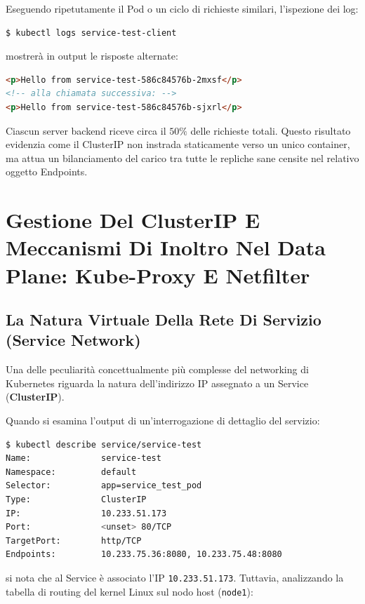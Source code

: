 \documentclass[11pt, a4paper]{article}
\begin{document}
Eseguendo ripetutamente il Pod o un ciclo di richieste similari, l'ispezione dei log:
\begin{lstlisting}[language=bash]
$ kubectl logs service-test-client
\end{lstlisting}
mostrerà in output le risposte alternate:
\begin{lstlisting}[language=html]
<p>Hello from service-test-586c84576b-2mxsf</p>
<!-- alla chiamata successiva: -->
<p>Hello from service-test-586c84576b-sjxrl</p>
\end{lstlisting}

Ciascun server backend riceve circa il $50\%$ delle richieste totali. Questo risultato evidenzia come il ClusterIP non instrada staticamente verso un unico container, ma attua un bilanciamento del carico tra tutte le repliche sane censite nel relativo oggetto Endpoints.

\newpage


\section{Gestione Del ClusterIP E Meccanismi Di Inoltro Nel Data Plane: Kube-Proxy E Netfilter}

\subsection{La Natura Virtuale Della Rete Di Servizio (Service Network)}
Una delle peculiarità concettualmente più complesse del networking di Kubernetes riguarda la natura dell'indirizzo IP assegnato a un Service (\textbf{ClusterIP}).

Quando si esamina l'output di un'interrogazione di dettaglio del servizio:
\begin{lstlisting}[language=bash]
$ kubectl describe service/service-test
Name:              service-test
Namespace:         default
Selector:          app=service_test_pod
Type:              ClusterIP
IP:                10.233.51.173
Port:              <unset> 80/TCP
TargetPort:        http/TCP
Endpoints:         10.233.75.36:8080, 10.233.75.48:8080
\end{lstlisting}
si nota che al Service è associato l'IP \texttt{10.233.51.173}. Tuttavia, analizzando la tabella di routing del kernel Linux sul nodo host (\texttt{node1}):
\end{document}
